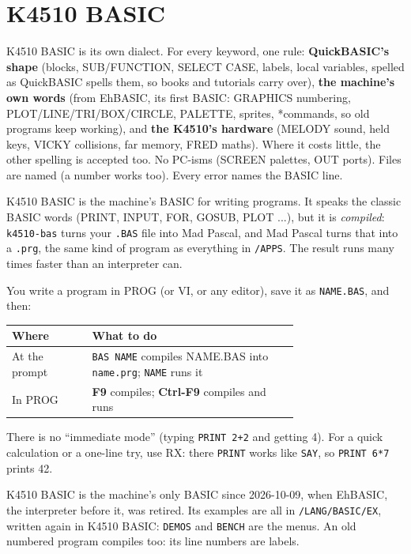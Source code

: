 \chapter{K4510 BASIC}\label{cha:kbasic}

K4510 BASIC is its own dialect. For every keyword, one rule:
\textbf{QuickBASIC's shape} (blocks, SUB/FUNCTION, SELECT CASE, labels, local
variables, spelled as QuickBASIC spells them, so books and tutorials
carry over), \textbf{the machine's own words} (from EhBASIC, its first
BASIC: GRAPHICS numbering, PLOT/LINE/TRI/BOX/CIRCLE, PALETTE, sprites, *commands, so old
programs keep working), and \textbf{the K4510's hardware} (MELODY sound, held
keys, VICKY collisions, far memory, FRED maths). Where it costs little,
the other spelling is accepted too. No PC-isms (SCREEN palettes, OUT
ports). Files are named (a number works too). Every error names the BASIC
line.

K4510 BASIC is the machine's BASIC for writing programs. It speaks
the classic BASIC words (PRINT, INPUT, FOR, GOSUB, PLOT ...), but it is
\emph{compiled}: \verb|k4510-bas| turns your \verb|.BAS| file into Mad Pascal, and Mad
Pascal turns that into a \verb|.prg|, the same kind of program as everything
in \verb|/APPS|. The result runs many times faster than an interpreter can.

You write a program in PROG (or VI, or any editor), save it as
\verb|NAME.BAS|, and then:

\begin{center}
\small
\begin{tabular}{@{}l >{\raggedright\arraybackslash}p{0.72\linewidth}@{}}
\toprule
\textbf{Where} & \textbf{What to do} \\
\midrule
At the prompt & \texttt{BAS NAME} compiles NAME.BAS into \verb|name.prg|; \verb|NAME| runs it \\
In PROG & \textbf{F9} compiles; \textbf{Ctrl-F9} compiles and runs \\
\bottomrule
\end{tabular}
\end{center}

There is no ``immediate mode'' (typing \texttt{PRINT 2+2} and getting 4). For a
quick calculation or a one-line try, use RX: there \verb|PRINT| works like
\verb|SAY|, so \texttt{PRINT 6*7} prints 42.

K4510 BASIC is the machine's only BASIC since 2026-10-09, when EhBASIC,
the interpreter before it, was retired. Its examples are all in
\verb|/LANG/BASIC/EX|, written again in K4510 BASIC: \verb|DEMOS| and \verb|BENCH| are
the menus. An old numbered program compiles too: its line numbers are
labels.

